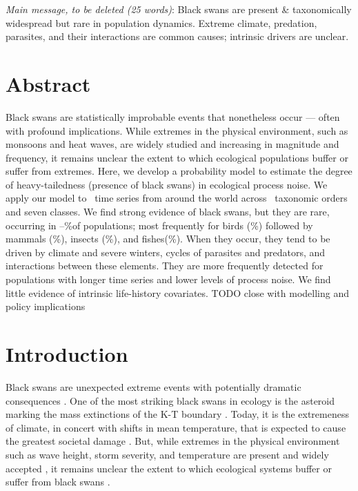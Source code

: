 
\noindent
\emph{Main message, to be deleted (25 words)}: Black swans are present \&
taxonomically widespread but rare in population dynamics. Extreme climate,
predation, parasites, and their interactions are common causes; intrinsic
drivers are unclear.

\section{Abstract}

Black swans are statistically improbable events that nonetheless occur ---
often with profound implications. While extremes in the physical environment,
such as monsoons and heat waves, are widely studied and increasing in magnitude
and frequency, it remains unclear the extent to which ecological populations
buffer or suffer from extremes. Here, we develop a probability model to
estimate the degree of heavy-tailedness (presence of black swans) in ecological
process noise. We apply our model to \NPops~time series from around the world
across \NOrders~taxonomic orders and seven classes. We find strong evidence of
black swans, but they are rare, occurring in
\overallMinPerc--\overallMaxPerc\%of populations; most frequently for birds
(\AvesRangePerc\%) followed by mammals (\MammaliaRangePerc\%), insects
(\InsectaRangePerc\%), and fishes(\OsteichthyesRangePerc\%). When they occur,
they tend to be driven by climate and severe winters, cycles of parasites and
predators, and interactions between these elements. They are more frequently
detected for populations with longer time series and lower levels of process
noise. We find little evidence of intrinsic life-history covariates. TODO close
with modelling and policy implications

\section{Introduction}

Black swans are unexpected extreme events with potentially dramatic
consequences \citep{taleb2007,sornette2009}. One of the most striking black
swans in ecology is the asteroid marking the mass extinctions of the K-T
boundary \citep{harnik2012}. Today, it is the extremeness of climate, in
concert with shifts in mean temperature, that is expected to cause the greatest
societal damage \citep{ipcc2012}. But, while extremes in the physical
environment such as wave height, storm severity, and temperature are present and
widely accepted \citep{gaines1993,katz2005}, it remains unclear the extent to
which ecological systems buffer or suffer from black swans \citep{nunez2012}.

